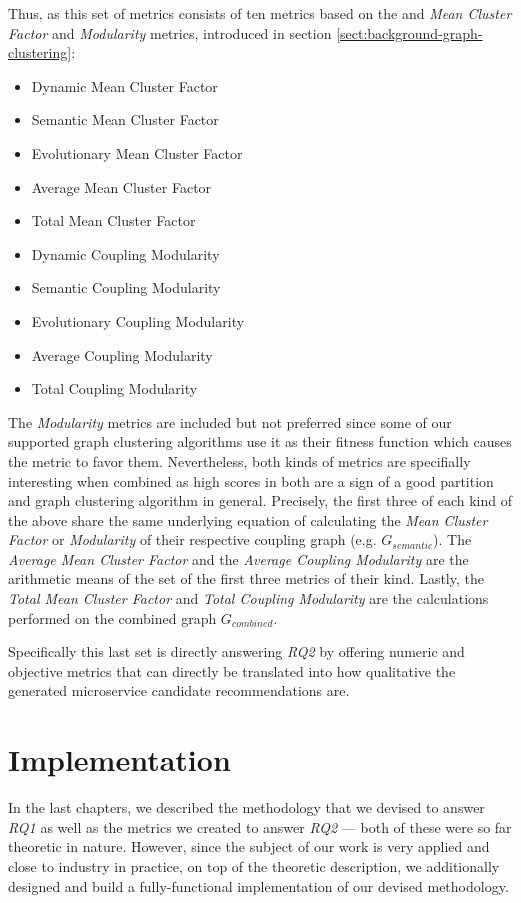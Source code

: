 \documentclass[12pt,a4paper]{report}
\begin{document}
Thus, as this set of metrics consists of ten metrics based on the and
\textit{Mean Cluster Factor} and \textit{Modularity} metrics, introduced in
section \ref{sect:background-graph-clustering}:
\begin{itemize}[noitemsep]
  \item Dynamic Mean Cluster Factor
  \item Semantic Mean Cluster Factor
  \item Evolutionary Mean Cluster Factor
  \item Average Mean Cluster Factor
  \item Total Mean Cluster Factor
  \item Dynamic Coupling Modularity
  \item Semantic Coupling Modularity
  \item Evolutionary Coupling Modularity
  \item Average Coupling Modularity
  \item Total Coupling Modularity
\end{itemize}
The \textit{Modularity} metrics are included but not preferred since some
of our supported graph clustering algorithms use it as their fitness function
which causes the metric to favor them. Nevertheless, both kinds of metrics
are specifially interesting when combined as high scores in both are a sign of
a good partition and graph clustering algorithm in general.
Precisely, the first three of each kind of the above share the same underlying
equation of calculating the \textit{Mean Cluster Factor} or \textit{Modularity}
of their respective coupling graph (e.g. \(G_{semantic}\)).
The \textit{Average Mean Cluster Factor} and the \textit{Average Coupling Modularity}
are the arithmetic means of the set of the first three metrics of their kind.
Lastly, the \textit{Total Mean Cluster Factor} and \textit{Total Coupling Modularity}
are the calculations performed on the combined graph \(G_{combined}\).

Specifically this last set is directly answering \textit{RQ2} by offering
numeric and objective metrics that can directly be translated into how
qualitative the generated microservice candidate recommendations are.




\chapter{Implementation} \label{chap:implementation}

In the last chapters, we described the methodology that we devised to answer
\textit{RQ1} as well as the metrics we created to answer \textit{RQ2} ---
both of these were so far theoretic in nature.
However, since the subject of our work is very applied and close to industry
in practice, on top of the theoretic description, we additionally designed
and build a fully-functional implementation of our devised methodology.
\end{document}
